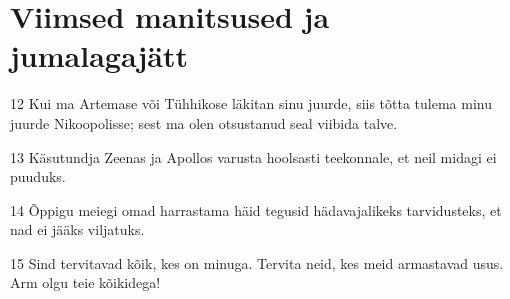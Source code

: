 \section*{Viimsed manitsused ja jumalagajätt}

\par 12 Kui ma Artemase või Tühhikose läkitan sinu juurde, siis tõtta tulema minu juurde Nikoopolisse; sest ma olen otsustanud seal viibida talve.
\par 13 Käsutundja Zeenas ja Apollos varusta hoolsasti teekonnale, et neil midagi ei puuduks.
\par 14 Õppigu meiegi omad harrastama häid tegusid hädavajalikeks tarvidusteks, et nad ei jääks viljatuks.
\par 15 Sind tervitavad kõik, kes on minuga. Tervita neid, kes meid armastavad usus. Arm olgu teie kõikidega!




